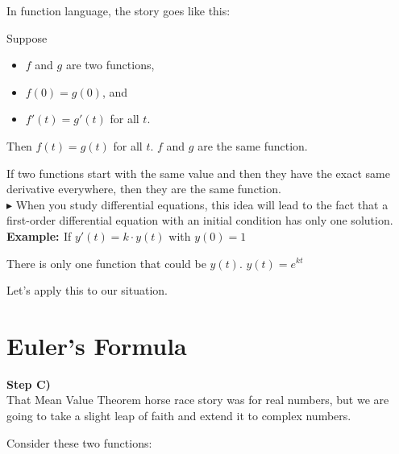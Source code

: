 \documentclass{ximera}
\begin{document}
In function language, the story goes like this:

Suppose 

\begin{itemize}
\item $f$ and $g$ are two functions,
\item $f(0) = g(0)$, and
\item $f'(t) = g'(t)$  for all $t$.
\end{itemize}

Then $f(t)=g(t)$ for all $t$.   $f$ and $g$ are the same function.



If two functions start with the same value and then they have the exact same derivative everywhere, then they are the same function. \\









$\blacktriangleright$  When you study differential equations, this idea will lead to the fact that a first-order differential equation with an initial condition has only one solution. \\

\textbf{\textcolor{blue!55!black}{Example: }} If $y'(t) = k \cdot y(t)$ with $y(0)=1$


There is only one function that could be $y(t)$.  $y(t) = e^{k t}$

Let's apply this to our situation. \\















\section*{Euler's Formula}


\textbf{\textcolor{purple!85!blue}{Step C)}} \\


That Mean Value Theorem horse race story was for real numbers, but we are going to take a slight leap of faith and extend it to complex numbers.




Consider these two functions:
\end{document}
